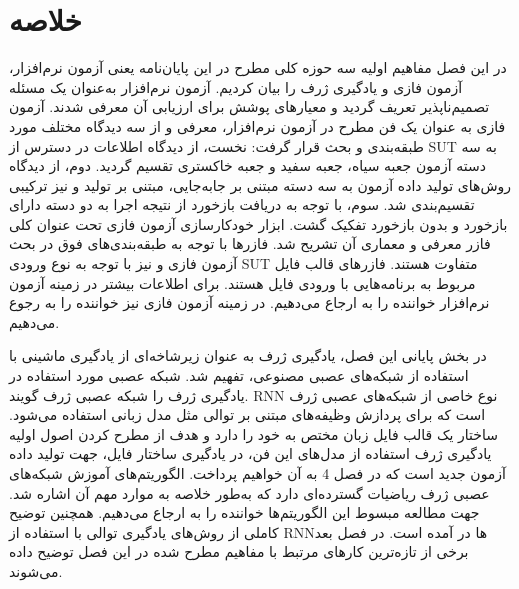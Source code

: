  \section{خلاصه}
 در این فصل مفاهیم اولیه سه حوزه کلی مطرح در این پایان‌نامه یعنی آزمون نرم‌افزار، آزمون فازی و یادگیری ژرف را بیان کردیم. آزمون نرم‌افزار به‌عنوان یک مسئله تصمیم‌ناپذیر تعریف گردید و معیارهای پوشش برای ارزیابی آن معرفی شدند. آزمون فازی به عنوان یک فن مطرح در آزمون نرم‌افزار، معرفی و از سه دیدگاه مختلف مورد طبقه‌بندی و بحث قرار گرفت: نخست، از دیدگاه اطلاعات در دسترس از \gls{SUT} به سه دسته آزمون جعبه سیاه، جعبه سفید و جعبه خاکستری تقسیم گردید. دوم، از دیدگاه روش‌های تولید داده آزمون به سه دسته مبتنی بر جابه‌جایی، مبتنی بر تولید و نیز ترکیبی تقسیم‌بندی شد. سوم، با توجه به دریافت بازخورد از نتیجه اجرا به دو دسته دارای بازخورد و بدون بازخورد تفکیک گشت. ابزار خودکارسازی آزمون فازی تحت عنوان کلی فازر معرفی و معماری آن تشریح شد.  فازرها با توجه به طبقه‌بندی‌های فوق در بحث آزمون فازی و نیز با توجه به نوع ورودی \gls{SUT} متفاوت هستند. فازرهای قالب فایل مربوط به برنامه‌هایی با ورودی فایل هستند. برای اطلاعات بیشتر در زمینه آزمون نرم‌افزار خواننده را به
  \cite{ammann2016introduction, PaulC.Jorgensen2014} 
 ارجاع می‌دهیم. در زمینه آزمون فازی نیز خواننده را به
 \cite{Chen2018, Mcnally2012, Sutton:2007:FBF:1324770}      
 رجوع می‌دهیم.
 
 در بخش پایانی این فصل، یادگیری ژرف به عنوان زیرشاخه‌ای از یادگیری ماشینی با استفاده از شبکه‌های عصبی مصنوعی، تفهیم شد. شبکه عصبی مورد استفاده در یادگیری ژرف را شبکه عصبی ژرف گویند. \gls{RNN} نوع خاصی از شبکه‌های عصبی ژرف است که برای پردازش وظیفه‌های مبتنی بر توالی مثل مدل زبانی استفاده می‌شود. ساختار یک قالب فایل زبان مختص به خود را دارد و هدف از مطرح کردن اصول اولیه یادگیری ژرف استفاده از مدل‌های این فن، در یادگیری ساختار فایل، جهت تولید داده آزمون جدید است که در فصل 4 به آن خواهیم پرداخت. الگوریتم‌های آموزش شبکه‌های عصبی ژرف ریاضیات گسترده‌ای دارد که به‌طور خلاصه به موارد مهم آن اشاره شد. جهت مطالعه مبسوط این الگوریتم‌ها خواننده را به
 \cite{Goodfellow-et-al-2016}
 ارجاع می‌دهیم. همچنین توضیح کاملی از روش‌های یادگیری توالی با استفاده از \gls{RNN}ها در 
 \cite{DBLP:journals/corr/Lipton15}
 آمده است. در فصل بعد برخی از تازه‌ترین کارهای مرتبط با مفاهیم مطرح شده در این فصل توضیح داده می‌شوند.   
 
 
 
 
 
 
 